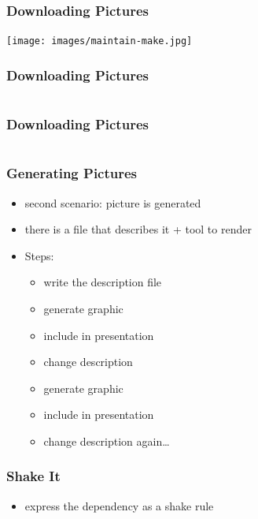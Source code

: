 \documentclass{beamer}
\begin{document}
\begin{frame}
  \frametitle{Downloading Pictures}
  \begin{center}
    \texttt{[image: images/maintain-make.jpg]}
  \end{center}
\end{frame}

\begin{frame}
  \frametitle{Downloading Pictures}
    \begin{center}
    \inputminted{text}{images/maintain-make.src}
  \end{center}
\end{frame}

\begin{frame}
  \frametitle{Downloading Pictures}
    \begin{center}
    \inputminted{haskell}{snippets/download-images.hs}
  \end{center}
\end{frame}

\begin{frame}
  \frametitle{Generating Pictures}
  \begin{itemize}
  \item second scenario: picture is generated
  \item there is a file that describes it + tool to render
  \item Steps:
    \begin{itemize}
    \item write the description file
    \item generate graphic
    \item include in presentation
    \item change description
    \item generate graphic
    \item include in presentation
    \item change description again\ldots{}
    \end{itemize}
  \end{itemize}
\end{frame}

\begin{frame}
  \frametitle{Shake It}
  \begin{itemize}
  \item express the dependency as a shake rule
  \end{itemize}
  \inputminted{haskell}{snippets/graphviz-rule.hs}
\end{frame}
\end{document}
